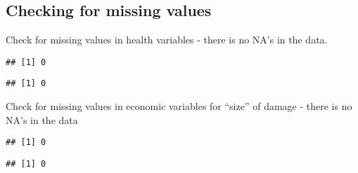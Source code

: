 \documentclass[
]{article}
\newenvironment{Shaded}{\begin{snugshade}}{\end{snugshade}}
\newcommand{\KeywordTok}[1]{\textcolor[rgb]{0.13,0.29,0.53}{\textbf{#1}}}
\newcommand{\NormalTok}[1]{#1}
\newcommand{\OperatorTok}[1]{\textcolor[rgb]{0.81,0.36,0.00}{\textbf{#1}}}
\begin{document}
\hypertarget{checking-for-missing-values}{%
\subsection{Checking for missing
values}\label{checking-for-missing-values}}

Check for missing values in health variables - there is no NA's in the
data.

\begin{Shaded}
\end{Shaded}

\begin{verbatim}
## [1] 0
\end{verbatim}

\begin{Shaded}
\end{Shaded}

\begin{verbatim}
## [1] 0
\end{verbatim}

Check for missing values in economic variables for ``size'' of damage -
there is no NA's in the data

\begin{Shaded}
\end{Shaded}

\begin{verbatim}
## [1] 0
\end{verbatim}

\begin{Shaded}
\end{Shaded}

\begin{verbatim}
## [1] 0
\end{verbatim}
\end{document}
